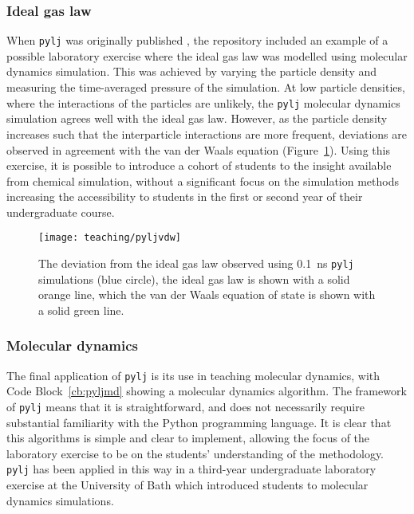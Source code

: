 \subsubsection{Ideal gas law}
When \texttt{pylj} was originally published \cite{mccluskey_pylj_2018}, the repository included an example of a possible laboratory exercise where the ideal gas law was modelled using molecular dynamics simulation.
This was achieved by varying the particle density and measuring the time-averaged pressure of the simulation.
At low particle densities, where the interactions of the particles are unlikely, the \texttt{pylj} molecular dynamics simulation agrees well with the ideal gas law.
However, as the particle density increases such that the interparticle interactions are more frequent, deviations are observed in agreement with the van der Waals equation (Figure~\ref{fig:vdw}).
Using this exercise, it is possible to introduce a cohort of students to the insight available from chemical simulation, without a significant focus on the simulation methods increasing the accessibility to students in the first or second year of their undergraduate course.
%
\begin{figure}
    \centering
    \texttt{[image: teaching/pyljvdw]}
    \caption{The deviation from the ideal gas law observed using \SI{0.1}{\nano\second} \texttt{pylj} simulations (blue circle), the ideal gas law is shown with a solid orange line, which the van der Waals equation of state is shown with a solid green line.}
    \label{fig:vdw}
\end{figure}
%

\subsubsection{Molecular dynamics}
The final application of \texttt{pylj} is its use in teaching molecular dynamics, with Code Block~\ref{cb:pyljmd} showing a molecular dynamics algorithm.
The framework of \texttt{pylj} means that it is straightforward, and does not necessarily require substantial familiarity with the Python programming language.
It is clear that this algorithms is simple and clear to implement, allowing the focus of the laboratory exercise to be on the students' understanding of the methodology.
\texttt{pylj} has been applied in this way in a third-year undergraduate laboratory exercise at the University of Bath which introduced students to molecular dynamics simulations.
